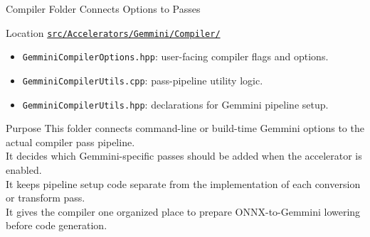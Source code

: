 \documentclass[aspectratio=169,10pt]{beamer}
\newcommand{\code}[1]{\texttt{\footnotesize #1}}
\newcommand{\repoRoot}{/home/lahcen/toolchains/onnx-mlir-xcompile/onnx-mlir}
\newcommand{\pathcode}[1]{\href{run:\repoRoot/#1}{\texttt{\scriptsize #1}}}
\begin{document}
\begin{frame}{Compiler Folder Connects Options to Passes}
  \begin{block}{Location}
    \pathcode{src/Accelerators/Gemmini/Compiler/}
  \end{block}
  \begin{itemize}
    \item \code{GemminiCompilerOptions.hpp}: user-facing compiler flags and options.
    \item \code{GemminiCompilerUtils.cpp}: pass-pipeline utility logic.
    \item \code{GemminiCompilerUtils.hpp}: declarations for Gemmini pipeline setup.
  \end{itemize}
  \begin{block}{Purpose}
    This folder connects command-line or build-time Gemmini options to the actual compiler pass pipeline.\\
    It decides which Gemmini-specific passes should be added when the accelerator is enabled.\\
    It keeps pipeline setup code separate from the implementation of each conversion or transform pass.\\
    It gives the compiler one organized place to prepare ONNX-to-Gemmini lowering before code generation.
  \end{block}
\end{frame}
\end{document}
